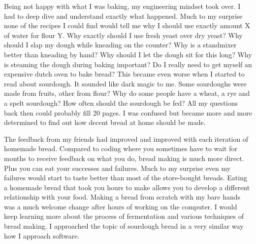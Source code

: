 Being not happy with what I was baking, my engineering mindset took over. I had
to deep dive and understand exactly what happened. Much to my surprise none
of the recipes I could find would tell me why I should use exactly amount X
of water for flour Y. Why exactly should I use fresh yeast over dry yeast?
Why should I slap my dough while kneading on the counter? Why is a standmixer
better than kneading by hand?  Why should I let the dough sit for this long?
Why is steaming the dough during baking important? Do I really need to
get myself an expensive dutch oven to bake bread? This became even worse
when I started to read about sourdough. It sounded like dark magic to me.
Some sourdoughs were made from fruits, other from flour? Why do some
people have a wheat, a rye and a spelt sourdough? How often should the sourdough be
fed? All my questions back then could probably fill 20 pages. I was confused
but became more and more determined to find out how decent bread at home
should be made.

The feedback from my friends had improved and improved with each
iteration of homemade bread. Compared to coding where
you sometimes have to wait for months to receive feedback on what you do,
bread making is much more direct. Plus you can eat your successes and failures.
Much to my surprise even my failures would start to taste
better than most of the store-bought breads. Eating a homemade bread that
took you hours to make allows you to develop a different relationship
with your food. Making a bread from scratch with my bare hands
was a much welcome change after hours of working on the computer.
I would keep learning more about the process of fermentation and
various techniques of bread making. I approached the topic of sourdough bread
in a very similar way how I approach software.

